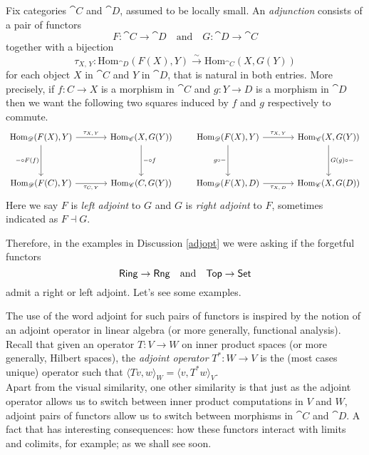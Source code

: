 \begin{definition}\label{adjdef}
Fix categories $\cat{C}$ and $\cat{D}$, assumed to be locally small. An \emph{adjunction} consists of a pair of functors
\[F:\cat{C} \to \cat{D} \quad \text{and} \quad G:\cat{D} \to \cat{C}\]
together with a bijection
\[\tau_{X,\,Y}: \mathrm{Hom}_{\cat{D}}(F(X),Y) \overset{\sim}{\to} \mathrm{Hom}_{\cat{C}}(X,G(Y))\]
for each object $X$ in $\cat{C}$ and $Y$ in $\cat{D}$, that is natural in both entries. More precisely, if $f:C \to X$ is a morphism in $\cat{C}$ and $g:Y \to D$ is a morphism in $\cat{D}$ then we want the following two squares induced by $f$ and $g$ respectively to commute.
\[\begin{tikzcd}[row sep=huge, column sep=large]
{\mathrm{Hom}_{\cat{D}}(F(X),Y)} \arrow[r, "\tau_{X,\,Y}"]   \arrow[d, "-\circ F(f)"']                       & {\mathrm{Hom}_{\cat{C}}(X,G(Y))} \arrow[d, "-\circ f"]                      \\
{\mathrm{Hom}_{\cat{D}}(F(C),Y)} \arrow[r, "\tau_{C,\,Y}"'] & {\mathrm{Hom}_{\cat{C}}(C,G(Y))} 
\end{tikzcd}
\qquad
\begin{tikzcd}[row sep=huge, column sep=large]
{\mathrm{Hom}_{\cat{D}}(F(X),Y)} \arrow[r, "\tau_{X,\,Y}"] \arrow[d, "g\circ-"'] & {\mathrm{Hom}_{\cat{C}}(X,G(Y))} \arrow[d, "G(g)\circ-"] \\
{\mathrm{Hom}_{\cat{D}}(F(X),D)} \arrow[r, "\tau_{X,\,D}"']                      & {\mathrm{Hom}_{\cat{C}}(X,G(D))}                        
\end{tikzcd}\]
Here we say $F$ is \emph{left adjoint} to $G$ and $G$ is \emph{right adjoint} to $F$, sometimes indicated as $F \dashv G$.
\end{definition}

\vspace*{0.1in}

Therefore, in the examples in Discussion \ref{adjopt} we were asking if the forgetful functors
\[\mathsf{Ring} \to \mathsf{Rng} \quad \text{and} \quad \mathsf{Top} \to \mathsf{Set}\]
admit a right or left adjoint. Let's see some examples.

\vspace*{0.1in}

\begin{remark}
The use of the word adjoint for such pairs of functors is inspired by the notion of an adjoint operator in linear algebra (or more generally, functional analysis). Recall that given an operator $T:V \to W$ on inner product spaces (or more generally, Hilbert spaces), the \emph{adjoint operator} $T^*:W \to V$ is the (most cases unique) operator such that $\langle Tv,w \rangle_W = \langle v,T^*w\rangle_V$.\\[1em]
Apart from the visual similarity, one other similarity is that just as the adjoint operator allows us to switch between inner product computations in $V$ and $W$, adjoint pairs of functors allow us to switch between morphisms in $\cat{C}$ and $\cat{D}$. A fact that has interesting consequences: how these functors interact with limits and colimits, for example; as we shall see soon. 
\end{remark}

